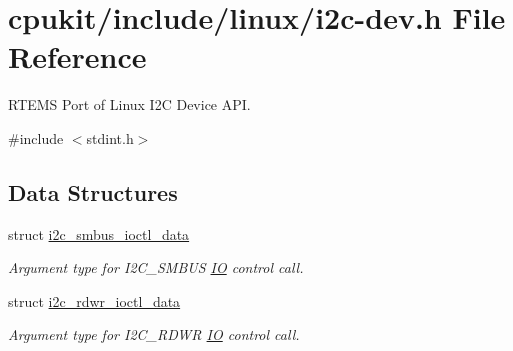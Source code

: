 \hypertarget{i2c-dev_8h}{}\section{cpukit/include/linux/i2c-\/dev.h File Reference}
\label{i2c-dev_8h}


R\+T\+E\+MS Port of Linux I2C Device A\+PI.  


{\ttfamily \#include $<$stdint.\+h$>$}\newline
\subsection*{Data Structures}
\begin{DoxyCompactItemize}
\item 
struct \mbox{\hyperlink{structi2c__smbus__ioctl__data}{i2c\+\_\+smbus\+\_\+ioctl\+\_\+data}}
\begin{DoxyCompactList}\small\item\em Argument type for I2\+C\+\_\+\+S\+M\+B\+US \mbox{\hyperlink{structIO}{IO}} control call. \end{DoxyCompactList}\item 
struct \mbox{\hyperlink{structi2c__rdwr__ioctl__data}{i2c\+\_\+rdwr\+\_\+ioctl\+\_\+data}}
\begin{DoxyCompactList}\small\item\em Argument type for I2\+C\+\_\+\+R\+D\+WR \mbox{\hyperlink{structIO}{IO}} control call. \end{DoxyCompactList}\end{DoxyCompactItemize}
